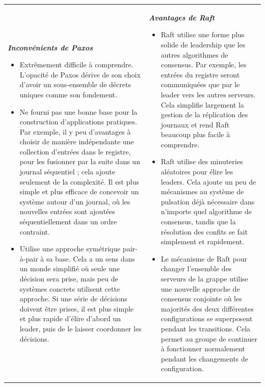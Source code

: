 \begin{tabular}{p{}p{}}
    \noindent
    \textbf{\textit{Inconvénients de Paxos}}

    \begin{itemize}
        \item Extrêmement difficile à comprendre. L'opacité de Paxos dérive de
            son choix d'avoir un sous-ensemble de décrets uniques comme son
            fondement.
        \item Ne fourni pas une bonne base pour la construction d'applications
            pratiques. Par exemple, il y peu d'avantages à choisir de manière
            indépendante une collection d'entrées dans le registre, pour les
            fusionner par la suite dans un journal séquentiel ; cela ajoute
            seulement de la complexité. Il est plus simple et plus efficace de
            concevoir un système autour d'un journal, où les nouvelles entrées
            sont ajoutées séquentiellement dans un ordre contraint.
        \item Utilise une approche symétrique pair-à-pair à sa base. Cela a un
            sens dans un monde simplifié où seule une décision sera prise, mais
            peu de systèmes concrets utilisent cette approche.  Si une série de
            décisions doivent être prises, il est plus simple et plus rapide
            d'élire d'abord un leader, puis de le laisser coordonner les
            décisions.
    \end{itemize} 
    
    &

    \textbf{\textit{Avantages de Raft}}

    \begin{itemize}
        \item Raft utilise une forme plus solide de leadership que les autres
            algorithmes de consensus. Par exemple, les entrées du registre
            seront communiquées que par le leader vers les autres serveurs. Cela
            simplifie largement la gestion de la réplication des journaux et
            rend Raft beaucoup plus facile à comprendre.
        \item Raft utilise des minuteries aléatoires pour élire les leaders.
            Cela ajoute un peu de mécanismes au système de pulsation déjà
            nécessaire dans n'importe quel algorithme de consensus, tandis que
            la résolution des confits se fait simplement et rapidement.
        \item Le mécanisme de Raft pour changer l'ensemble des serveurs de la
            grappe utilise une nouvelle approche de consensus conjointe où les
            majorités des deux différentes configurations se superposent pendant
            les transitions. Cela permet au groupe de continuer à fonctionner
            normalement pendant les changements de configuration.
    \end{itemize}

\end{tabular}

